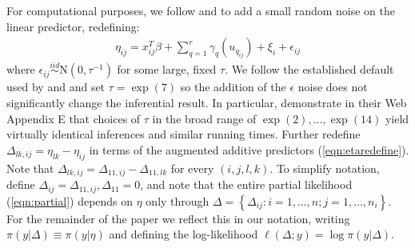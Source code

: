 \documentclass[]{article}
\begin{document}
For computational purposes, we follow \citet{inla} and \citet{casecross} to add a small random noise on the linear predictor, redefining: 
\begin{equation}\begin{aligned}\label{eqn:etaredefine}
\eta_{ij} =x_{ij}^{T}\beta+\sum_{q=1}^{r} \gamma_q(u_{q_{ij}}) +\xi_{i} + \epsilon_{ij}
\end{aligned}\end{equation}
where $\epsilon_{ij} \stackrel{iid}{\sim} \text{N}(0,\tau^{-1})$ for some large, fixed $\tau$. We follow the established default used by \citet{inla} and \citet{casecross} and set $\tau = \exp(7)$ so the addition of the $\epsilon$ noise does not significantly change the inferential result. In particular, \citet{casecross} demonstrate in their Web Appendix E that choices of $\tau$ in the broad range of $\exp(2),\ldots,\exp(14)$ yield virtually identical inferences and similar running times. Further redefine $\Delta_{lk,ij} = \eta_{lk} - \eta_{ij}$ in terms of the augmented additive predictors (\ref{eqn:etaredefine}). Note that $\Delta_{lk,ij} = \Delta_{11,ij} - \Delta_{11,lk}$ for every $(i,j,l,k)$. To simplify notation, define $\Delta_{ij} = \Delta_{11,ij}, \Delta_{11} = 0$, and note that the entire partial likelihood (\ref{eqn:partial}) depends on $\eta$ only through  $\Delta = \left\{\Delta_{ij}: i = 1,\ldots,n; j = 1,\ldots,n_{i} \right\}$. For the remainder of the paper we reflect this in our notation, writing $\pi(y|\Delta) \equiv \pi(y|\eta)$ and defining the log-likelihood $\ell(\Delta; y) = \log\pi(y|\Delta)$.
\end{document}
